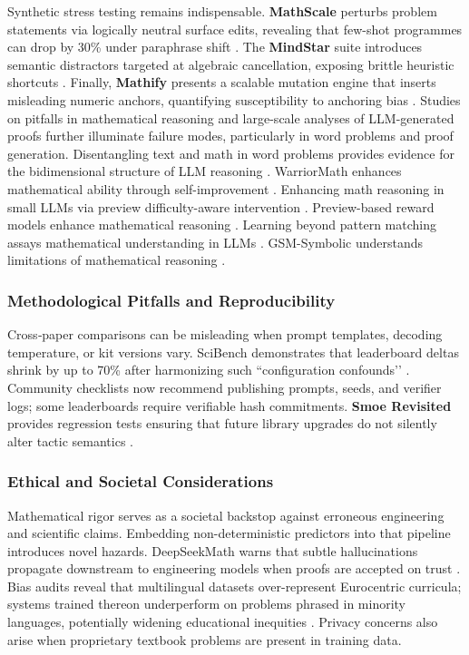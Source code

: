 \documentclass[acmsmall,anonymous]{acmart}
\begin{document}
Synthetic stress testing remains indispensable.  \textbf{MathScale} perturbs problem statements via logically neutral surface edits, revealing that few-shot programmes can drop by 30\% under paraphrase shift \cite{tang2024mathscale}.  The \textbf{MindStar} suite introduces semantic distractors targeted at algebraic cancellation, exposing brittle heuristic shortcuts \cite{li2024mindstar}.  Finally, \textbf{Mathify} presents a scalable mutation engine that inserts misleading numeric anchors, quantifying susceptibility to anchoring bias \cite{imani2024mathify,imani2024mathprompter}. Studies on pitfalls in mathematical reasoning \cite{anonymous2025canllmmath,anonymous2025wordsense,anonymous2025canllmmath,anonymous2025wordsense} and large-scale analyses of LLM-generated proofs \cite{anonymous2025largescaleproofs,anonymous2025largescaleproofs} further illuminate failure modes, particularly in word problems and proof generation. Disentangling text and math in word problems provides evidence for the bidimensional structure of LLM reasoning \cite{calais-etal-2025-disentangling}. WarriorMath enhances mathematical ability through self-improvement \cite{anonymous2025warriormath}. Enhancing math reasoning in small LLMs via preview difficulty-aware intervention \cite{anonymous2025enhancingmathsmall}. Preview-based reward models enhance mathematical reasoning \cite{anonymous2025enhancingmathreasoningllm}. Learning beyond pattern matching assays mathematical understanding in LLMs \cite{guo2024a}. GSM-Symbolic understands limitations of mathematical reasoning \cite{mirzadeh2024}.

\subsubsection{Methodological Pitfalls and Reproducibility}\label{sec:method}
Cross‐paper comparisons can be misleading when prompt templates, decoding temperature, or kit versions vary. SciBench demonstrates that leaderboard deltas shrink by up to 70\% after harmonizing such “configuration confounds’’ \cite{chen2024scibench}.  Community checklists now recommend publishing prompts, seeds, and verifier logs; some leaderboards require verifiable hash commitments.  \textbf{Smoe Revisited} provides regression tests ensuring that future library upgrades do not silently alter tactic semantics \cite{williams2024smoerevisited}.

\subsubsection{Ethical and Societal Considerations}\label{sec:ethics}
Mathematical rigor serves as a societal backstop against erroneous engineering and scientific claims.  Embedding non-deterministic predictors into that pipeline introduces novel hazards. DeepSeekMath warns that subtle hallucinations propagate downstream to engineering models when proofs are accepted on trust \cite{shao2024deepseekmath}.  Bias audits reveal that multilingual datasets over-represent Eurocentric curricula; systems trained thereon underperform on problems phrased in minority languages, potentially widening educational inequities \cite{li2024xwinmath}.  Privacy concerns also arise when proprietary textbook problems are present in training data.
\end{document}
